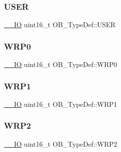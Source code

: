 \subsubsection{\texorpdfstring{USER}{USER}}
{\footnotesize\ttfamily \mbox{\hyperlink{group___c_m_s_i_s___c_m3__core__definitions_gaec43007d9998a0a0e01faede4133d6be}{\+\_\+\+\_\+\+IO}} uint16\+\_\+t O\+B\+\_\+\+Type\+Def\+::\+U\+S\+ER}

\mbox{\label{struct_o_b___type_def_acee93898f092604a871e52d64560e7a9}} 
\subsubsection{\texorpdfstring{WRP0}{WRP0}}
{\footnotesize\ttfamily \mbox{\hyperlink{group___c_m_s_i_s___c_m3__core__definitions_gaec43007d9998a0a0e01faede4133d6be}{\+\_\+\+\_\+\+IO}} uint16\+\_\+t O\+B\+\_\+\+Type\+Def\+::\+W\+R\+P0}

\mbox{\label{struct_o_b___type_def_ad397993d8c149a64e3f2a8bc7ecdf1c5}} 
\subsubsection{\texorpdfstring{WRP1}{WRP1}}
{\footnotesize\ttfamily \mbox{\hyperlink{group___c_m_s_i_s___c_m3__core__definitions_gaec43007d9998a0a0e01faede4133d6be}{\+\_\+\+\_\+\+IO}} uint16\+\_\+t O\+B\+\_\+\+Type\+Def\+::\+W\+R\+P1}

\mbox{\label{struct_o_b___type_def_a475b2347222db8e35d7ade1a881ca31c}} 
\subsubsection{\texorpdfstring{WRP2}{WRP2}}
{\footnotesize\ttfamily \mbox{\hyperlink{group___c_m_s_i_s___c_m3__core__definitions_gaec43007d9998a0a0e01faede4133d6be}{\+\_\+\+\_\+\+IO}} uint16\+\_\+t O\+B\+\_\+\+Type\+Def\+::\+W\+R\+P2}

\mbox{\label{struct_o_b___type_def_ab8bdaebc42e051ff9911eb88dad75f92}} 
